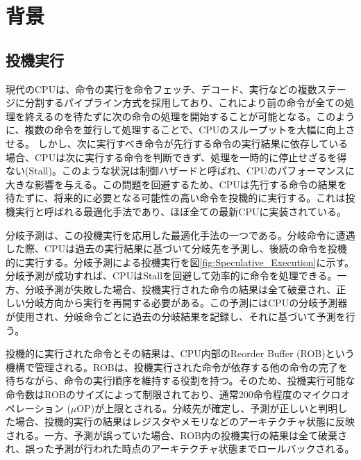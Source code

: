 \section{背景}
\subsection{投機実行}
\label{sec:spec_exec}

現代のCPUは、命令の実行を命令フェッチ、デコード、実行などの複数ステージに分割するパイプライン方式を採用しており、これにより前の命令が全ての処理を終えるのを待たずに次の命令の処理を開始することが可能となる。このように、複数の命令を並行して処理することで、CPUのスループットを大幅に向上させる。
しかし、次に実行すべき命令が先行する命令の実行結果に依存している場合、CPUは次に実行する命令を判断できず、処理を一時的に停止せざるを得ない(Stall)。このような状況は制御ハザードと呼ばれ、CPUのパフォーマンスに大きな影響を与える。この問題を回避するため、CPUは先行する命令の結果を待たずに、将来的に必要となる可能性の高い命令を投機的に実行する。これは投機実行と呼ばれる最適化手法であり、ほぼ全ての最新CPUに実装されている。\par

分岐予測は、この投機実行を応用した最適化手法の一つである。分岐命令に遭遇した際、CPUは過去の実行結果に基づいて分岐先を予測し、後続の命令を投機的に実行する。分岐予測による投機実行を図\ref{fig:Speculative_Execution}に示す。分岐予測が成功すれば、CPUはStallを回避して効率的に命令を処理できる。一方、分岐予測が失敗した場合、投機実行された命令の結果は全て破棄され、正しい分岐方向から実行を再開する必要がある。この予測にはCPUの分岐予測器が使用され、分岐命令ごとに過去の分岐結果を記録し、それに基づいて予測を行う。\par

投機的に実行された命令とその結果は、CPU内部のReorder Buffer (ROB)という機構で管理される。ROBは、投機実行された命令が依存する他の命令の完了を待ちながら、命令の実行順序を維持する役割を持つ。そのため、投機実行可能な命令数はROBのサイズによって制限されており、通常200命令程度のマイクロオペレーション ($\mu$OP)が上限とされる。分岐先が確定し、予測が正しいと判明した場合、投機的実行の結果はレジスタやメモリなどのアーキテクチャ状態に反映される。一方、予測が誤っていた場合、ROB内の投機実行の結果は全て破棄され、誤った予測が行われた時点のアーキテクチャ状態までロールバックされる。

